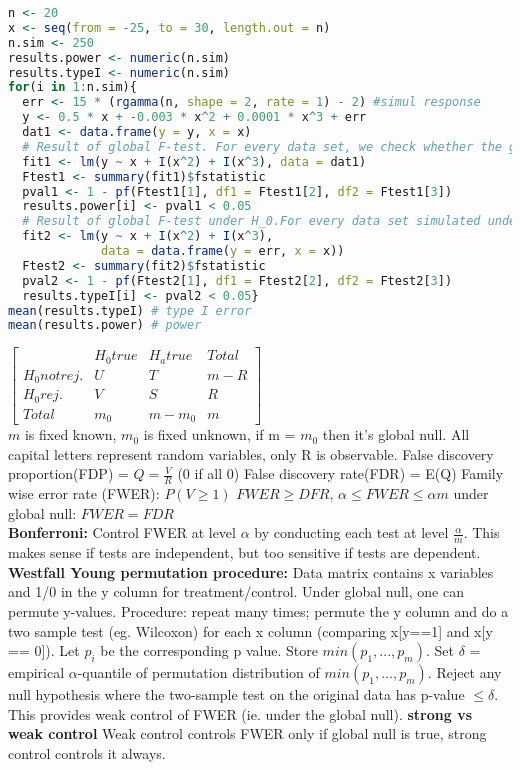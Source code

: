 \begin{lstlisting}[language = R]
n <- 20
x <- seq(from = -25, to = 30, length.out = n)
n.sim <- 250
results.power <- numeric(n.sim)
results.typeI <- numeric(n.sim)
for(i in 1:n.sim){
  err <- 15 * (rgamma(n, shape = 2, rate = 1) - 2) #simul response
  y <- 0.5 * x + -0.003 * x^2 + 0.0001 * x^3 + err
  dat1 <- data.frame(y = y, x = x)
  # Result of global F-test. For every data set, we check whether the global null hypothesis is being rejected or not.
  fit1 <- lm(y ~ x + I(x^2) + I(x^3), data = dat1)
  Ftest1 <- summary(fit1)$fstatistic
  pval1 <- 1 - pf(Ftest1[1], df1 = Ftest1[2], df2 = Ftest1[3])
  results.power[i] <- pval1 < 0.05
  # Result of global F-test under H_0.For every data set simulated under H_0, we check whether the F-test is rejected.
  fit2 <- lm(y ~ x + I(x^2) + I(x^3),
             data = data.frame(y = err, x = x))
  Ftest2 <- summary(fit2)$fstatistic
  pval2 <- 1 - pf(Ftest2[1], df1 = Ftest2[2], df2 = Ftest2[3])
  results.typeI[i] <- pval2 < 0.05}
mean(results.typeI) # type I error
mean(results.power) # power
\end{lstlisting}
$\begin{bmatrix}
& H_0 true & H_a true& Total \\
H_0 not rej. & U & T & m-R\\
H_0rej. & V & S & R \\
Total & m_0 & m-m_0 & m
\end{bmatrix}$\\
$m$ is fixed known, $m_0$ is fixed unknown, if m = $m_0$ then it's global null. All capital letters represent random variables, only R is observable. 
False discovery proportion(FDP) = $Q = \frac{V}{R}$ (0 if all 0)
False discovery rate(FDR) = E(Q) 
Family wise error rate (FWER): $P(V \geq 1)$
$FWER \geq DFR$, $\alpha \leq FWER \leq \alpha m$ under global null: $FWER = FDR$ \\
\textbf{Bonferroni: } Control FWER at level $\alpha$ by conducting each test at level $\frac{\alpha}{m}$. This makes sense if tests are independent, but too sensitive if tests are dependent.  \\
\textbf{Westfall Young permutation procedure: } Data matrix contains x variables and 1/0 in the y column for treatment/control. Under global null, one can permute y-values. Procedure: repeat many times; permute the y column and do a two sample test (eg. Wilcoxon) for each x column (comparing x[y==1] and x[y == 0]). Let $p_i$ be the corresponding p value. Store $min(p_1,...,p_m)$. Set $\delta$ = empirical $\alpha$-quantile of permutation distribution of $min(p_1,...,p_m)$. Reject any null hypothesis where the two-sample test on the original data has p-value $\leq \delta$. This provides weak control of FWER (ie. under the global null). \textbf{strong vs weak control} Weak control controls FWER only if global null is true, strong control controls it always.
